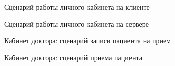 
\begin{figure}[h]
\caption{Сценарий работы личного кабинета на клиенте}
\label{app:sequence_client}

% 

\end{figure}

\newpage
\begin{figure}[h]
\caption{Сценарий работы личного кабинета на сервере}
\label{app:sequence_server}


\end{figure}

\newpage
\begin{figure}[h]
\caption{Кабинет доктора: сценарий записи пациента на прием}
\label{app:patient_assigning_appointment_seq_diagr}
\end{figure}

\newpage
\begin{figure}[h]
\caption{Кабинет доктора: сценарий приема пациента}
\label{app:doctor_cabient_appointment}


\end{figure}

